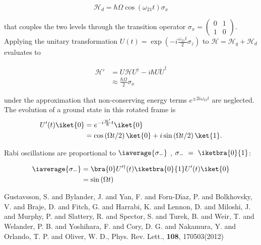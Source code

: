 \begin{thebibliography}{99}
  \begin{equation}
    \label{eq:rabi2}
    \mathcal{H}_{d} = \hbar\Omega\cos(\omega_{21}t)\sigma_{x}
  \end{equation}

  \noindent that couples the two levels through the transition operator $\sigma_x = \ensuremath{\left(\begin{smallmatrix} 0 & 1 \\ 1 & 0 \end{smallmatrix}\right)} $. Applying the unitary transformation $ U(t) = \exp \left(-i \frac{\omega_{21}t}{2}\sigma_z\right) $ to $ \mathcal{H} = \mathcal{H}_{q}+\mathcal{H}_{d} $ evaluates to

  \begin{equation}
    \label{eq:rabi3}
    \begin{aligned}
      \mathcal{H}'& = U\mathcal{H}U^{\dag} - i\hbar U\dot{U}^{\dag}\\
      & \approx \frac{\hbar\Omega}{2}\sigma_x
      \end{aligned}
  \end{equation}

  \noindent under the approximation that non-conserving energy terms $ e^{\pm 2i\omega_{21}t} $ are neglected. The evolution of a ground state in this rotated frame is
  \begin{equation}
    \label{eq:rabi4}
    \begin{aligned}
      U'(t)\iket{0} & = e^{-i\frac{\mathcal{H'}}{\hbar}t}\iket{0} \\
      & = \cos\left({\Omega t}/{2}\right)\ket{0}+i\sin\left({\Omega t}/{2}\right)\ket{1}.
    \end{aligned}
  \end{equation}

  \noindent Rabi oscillations are proportional to $ \iaverage{\sigma_{-}} $ \cite{Astafiev2010}, $\sigma_{-}~=~\iketbra{0}{1}$:

  \begin{equation}
    \label{eq:rabi5}
    \begin{aligned}
      \iaverage{\sigma_{-}} & = \bra{0}U'^{\dag}(t) \iketbra{0}{1} U'(t)\iket{0}\\
      & = \sin \left(\Omega t\right)
    \end{aligned}
  \end{equation}

 {Gustavsson, S. and Bylander, J. and Yan,
    F. and Forn-D\'{\i}az, P. and Bolkhovsky, V. and Braje, D. and
    Fitch, G. and Harrabi, K. and Lennon, D. and Miloshi, J. and
    Murphy, P. and Slattery, R. and Spector, S. and Turek, B. and
    Weir, T. and Welander, P. B. and Yoshihara, F. and Cory, D. G. and
    Nakamura, Y. and Orlando, T. P. and Oliver, W. D.},
  {Phys. Rev. Lett.}, \textbf{108}, 170503(2012)



\end{thebibliography}
